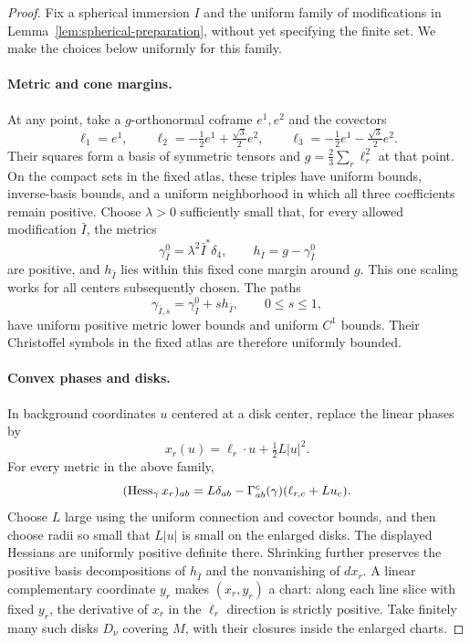 \begin{proof}
Fix a spherical immersion $I$ and the uniform family of modifications in
Lemma~\ref{lem:spherical-preparation}, without yet specifying the finite set.
We make the choices below uniformly for this family.

\paragraph{Metric and cone margins.}
At any point, take a $g$-orthonormal coframe $e^1,e^2$ and the covectors
\[
 \ell_1=e^1,\qquad
 \ell_2=-\tfrac12e^1+\tfrac{\sqrt3}{2}e^2,\qquad
 \ell_3=-\tfrac12e^1-\tfrac{\sqrt3}{2}e^2.
\]
Their squares form a basis of symmetric tensors and
$g=\frac23\sum_r\ell_r^2$ at that point.  On the compact sets in the fixed
atlas, these triples have uniform bounds, inverse-basis bounds, and a
uniform neighborhood in which all three coefficients remain positive.
Choose $\lambda>0$ sufficiently small that, for every allowed modification
$\bar I$, the metrics
\[
 \gamma^0_{\bar I}=\lambda^2\bar I^*\delta_4,
 \qquad h_{\bar I}=g-\gamma^0_{\bar I}
\]
are positive, and $h_{\bar I}$ lies within this fixed cone margin around
$g$.  This one scaling works for all centers subsequently chosen.
The paths
\[
 \gamma_{\bar I,s}=\gamma^0_{\bar I}+s h_{\bar I},
 \qquad 0\le s\le1,
\]
have uniform positive metric lower bounds and uniform $C^1$ bounds.  Their
Christoffel symbols in the fixed atlas are therefore uniformly bounded.

\paragraph{Convex phases and disks.}
In background coordinates $u$ centered at a disk center, replace the linear
phases by
\[
 x_r(u)=\ell_r\cdot u+\tfrac12L|u|^2.
\]
For every metric in the above family,
\[
 (\operatorname{Hess}_\gamma x_r)_{ab}
   =L\delta_{ab}-\Gamma^c_{ab}(\gamma)(\ell_{r,c}+Lu_c).
\]
Choose $L$ large using the uniform connection and covector bounds, and then
choose radii so small that $L|u|$ is small on the enlarged disks.  The
displayed Hessians are uniformly positive definite there.  Shrinking
further preserves the positive basis decompositions of $h_{\bar I}$ and
the nonvanishing of $dx_r$.  A linear complementary coordinate $y_r$ makes
$(x_r,y_r)$ a chart: along each line slice with fixed $y_r$, the derivative
of $x_r$ in the $\ell_r$ direction is strictly positive.  Take finitely many
such disks $D_\nu$ covering $M$, with their closures inside the enlarged
charts.


\end{proof}
